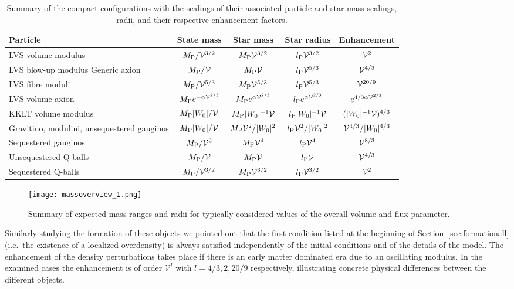 \documentclass[11pt,a4paper]{article}
\begin{document}
\begin{table}
\begin{center}
{\tabcolsep=5pt
\renewcommand{\arraystretch}{1.5}
\begin{tabular}{p{4cm} || c | c | c | c}
Particle & State mass & Star mass & Star radius & Enhancement\\ \hline \hline
LVS volume modulus & $M_{\rm P}/{{\cal V}^{3/2}}$& $M_{\rm P}{\cal V}^{3/2}$ &  $l_{\rm P} {\cal V}^{3/2}$& ${\cal V}^2$ \\ \hline
LVS blow-up modulus Generic axion & $M_{\rm P}/{{\cal V}}$ &$M_{\rm P}{\cal V}$ & $l_{\rm P} {\cal V}^{5/3}$ & ${\cal V}^{4/3}$\\ \hline
LVS fibre moduli & $M_{\rm P}/{{\cal V}^{5/3}}$  & $M_{\rm P}{\cal V}^{5/3}$&$l_{\rm P}{\cal V}^{5/3}$&${\cal V}^{20/9}$\\ \hline
LVS volume axion & $M_{\rm P} e^{-\alpha {\cal V}^{2/3}}$ & $M_{\rm P}e^{\alpha {\cal V}^{2/3}}$&    $l_{\rm P} e^{\alpha {\cal V}^{2/3}}$& $e^{4/3\alpha {\cal V}^{2/3}}$\\ \hline
KKLT volume modulus & $M_{\rm P}|W_0|/{\cal V}$& $M_{\rm P}|W_0|^{-1}{\cal V}$&$l_{\rm P}|W_0|^{-1}{\cal V}$&$(|W_0|^{-1}{\cal V})^{4/3}$\\ \hline
Gravitino, modulini, unsequestered gauginos & $M_{\rm P} |W_0|/{{\cal V}}$ & $M_{\rm P}{\cal V}^2/|W_0|^2$& $l_{\rm P}{\cal V}^2/|W_0|^2$& ${\cal V}^{4/3}/|W_0|^{4/3}$\\ \hline
Sequestered gauginos & $M_{\rm P}/{{\cal V}^2}$&$M_{\rm P}{\cal V}^4$&$l_{\rm P}{\cal V}^4$&${\cal V}^{8/3}$\\ \hline
Unsequestered Q-balls& $M_{\rm P}/{{\cal V}}$&$M_{\rm P}{\cal V}$&$l_{\rm P}{\cal V}$&${\cal V}^{4/3}$\\ \hline
Sequestered Q-balls & $M_{\rm P}/{{\cal V}^{3/2}}$&$M_{\rm P}{\cal V}^{3/2}$&$l_{\rm P}{\cal V}^{3/2}$&${\cal V}^{2}$
\end{tabular}}
\end{center}
\caption{Summary of the compact configurations with the scalings of their associated particle and star mass scalings, radii, and their respective enhancement factors. \label{tab:summary}}
\end{table}
\begin{figure}
\begin{center}
\texttt{[image: massoverview\_1.png]}
\end{center}
\caption{Summary of expected mass ranges and radii for typically considered values of the overall volume and flux parameter.\label{fig:massvsradiussummary}}
\end{figure}
Similarly studying the formation of these objects we pointed out that the first condition listed at the beginning of Section~\ref{sec:formationall} (i.e.~the existence of a localized overdensity) is always satisfied independently of the initial conditions and of the details of the model. The enhancement of the density perturbations takes place if there is an early matter dominated era due to an oscillating modulus. In the examined cases the enhancement is of order $\mathcal{V}^l$ with $l=4/3, 2, 20/9$ respectively, illustrating concrete physical differences between the different objects.
\end{document}
